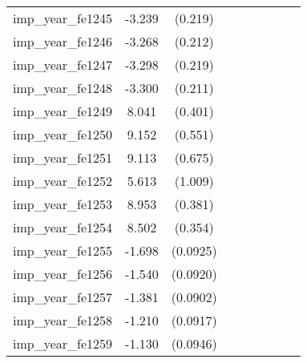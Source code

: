 {\begin{tabular}{l*{4}{cc}}
imp\_year\_fe1245&   -3.239\sym{***}&  (0.219)&                  &         &                  &         &                  &         \\
imp\_year\_fe1246&   -3.268\sym{***}&  (0.212)&                  &         &                  &         &                  &         \\
imp\_year\_fe1247&   -3.298\sym{***}&  (0.219)&                  &         &                  &         &                  &         \\
imp\_year\_fe1248&   -3.300\sym{***}&  (0.211)&                  &         &                  &         &                  &         \\
imp\_year\_fe1249&    8.041\sym{***}&  (0.401)&                  &         &                  &         &                  &         \\
imp\_year\_fe1250&    9.152\sym{***}&  (0.551)&                  &         &                  &         &                  &         \\
imp\_year\_fe1251&    9.113\sym{***}&  (0.675)&                  &         &                  &         &                  &         \\
imp\_year\_fe1252&    5.613\sym{***}&  (1.009)&                  &         &                  &         &                  &         \\
imp\_year\_fe1253&    8.953\sym{***}&  (0.381)&                  &         &                  &         &                  &         \\
imp\_year\_fe1254&    8.502\sym{***}&  (0.354)&                  &         &                  &         &                  &         \\
imp\_year\_fe1255&   -1.698\sym{***}& (0.0925)&                  &         &                  &         &                  &         \\
imp\_year\_fe1256&   -1.540\sym{***}& (0.0920)&                  &         &                  &         &                  &         \\
imp\_year\_fe1257&   -1.381\sym{***}& (0.0902)&                  &         &                  &         &                  &         \\
imp\_year\_fe1258&   -1.210\sym{***}& (0.0917)&                  &         &                  &         &                  &         \\
imp\_year\_fe1259&   -1.130\sym{***}& (0.0946)&                  &         &                  &         &                  &         \\

\end{tabular}}

